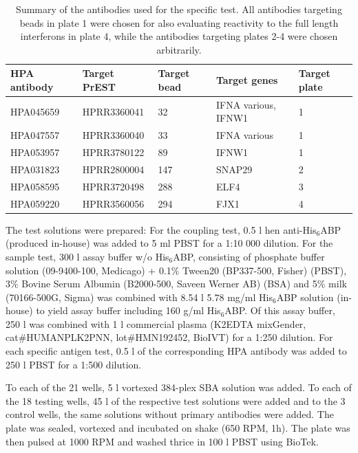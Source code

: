 \documentclass{article}
\begin{document}
\begin{table}[H]
\centering
\caption{Summary of the antibodies used for the specific test. All antibodies targeting beads in plate 1 were chosen for also evaluating reactivity to the full length interferons in plate 4, while the antibodies targeting plates 2-4 were chosen arbitrarily.}
\label{specific_table}
\begin{tabular}{@{}lllll@{}}
\toprule
\textbf{HPA antibody} & \textbf{Target PrEST} & \textbf{Target bead} & \textbf{Target genes} & \textbf{Target plate} \\ \midrule
HPA045659 & HPRR3360041 & 32 & IFNA various, IFNW1 & 1 \\
HPA047557 & HPRR3360040 & 33 & IFNA various & 1 \\
HPA053957 & HPRR3780122 & 89 & IFNW1 & 1 \\
HPA031823 & HPRR2800004 & 147 & SNAP29 & 2 \\
HPA058595 & HPRR3720498 & 288 & ELF4 & 3 \\
HPA059220 & HPRR3560056 & 294 & FJX1 & 4 \\ \bottomrule
\end{tabular}
\end{table}

The test solutions were prepared: For the coupling test, 0.5 \textmu l hen anti-His$_6$ABP (produced in-house) was added to 5 ml PBST for a 1:10 000 dilution. For the sample test, 300 \textmu l assay buffer w/o His$_6$ABP, consisting of phosphate buffer solution (09-9400-100, Medicago) + 0.1\% Tween20 (BP337-500, Fisher) (PBST), 3\% Bovine Serum Albumin (B2000-500, Saveen Werner AB) (BSA) and 5\% milk (70166-500G, Sigma) was combined with 8.54 \textmu l 5.78 mg/ml His$_6$ABP solution (in-house) to yield assay buffer including 160 \textmu g/ml His$_6$ABP. Of this assay buffer, 250 \textmu l was combined with 1 \textmu l commercial plasma (K2EDTA mixGender, cat\#HUMANPLK2PNN, lot\#HMN192452, BioIVT) for a 1:250 dilution. For each specific antigen test, 0.5 \textmu l of the corresponding HPA antibody was added to 250 \textmu l PBST for a 1:500 dilution.

To each of the 21 wells, 5 \textmu l vortexed 384-plex SBA solution was added. To each of the 18 testing wells, 45 \textmu l of the respective test solutions were added and to the 3 control wells, the same solutions without primary antibodies were added. The plate was sealed, vortexed and incubated on shake (650 RPM, 1h). The plate was then pulsed at 1000 RPM and washed thrice in 100 \textmu l PBST using BioTek.
\end{document}
